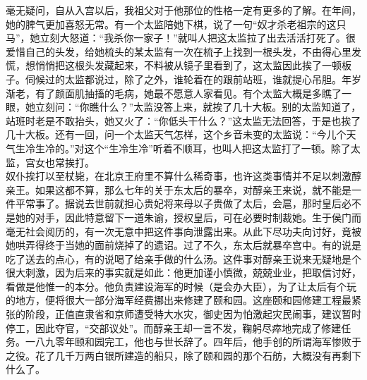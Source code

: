 毫无疑问，自从入宫以后，我祖父对于他那位的性格一定有更多的了解。在年间，她的脾气更加喜怒无常。有一个太监陪她下棋，说了一句“奴才杀老祖宗的这只马”，她立刻大怒道：“我杀你一家子！”就叫人把这太监拉了出去活活打死了。很爱惜自己的头发，给她梳头的某太监有一次在梳子上找到一根头发，不由得心里发慌，想悄悄把这根头发藏起来，不料被从镜子里看到了，这太监因此挨了一顿板子。伺候过的太监都说过，除了之外，谁轮着在的跟前站班，谁就提心吊胆。年岁渐老，有了颜面肌抽搐的毛病，她最不愿意人家看见。有个太监大概是多瞧了一眼，她立刻问：“你瞧什么？”太监没答上来，就挨了几十大板。别的太监知道了，站班时老是不敢抬头，她又火了：“你低头干什么？”这太监无法回答，于是也挨了几十大板。还有一回，问一个太监天气怎样，这个乡音未变的太监说：“今儿个天气生冷生冷的。”对这个“生冷生冷”听着不顺耳，也叫人把这太监打了一顿。除了太监，宫女也常挨打。\\

奴仆挨打以至杖毙，在北京王府里不算什么稀奇事，也许这类事情并不足以刺激醇亲王。如果这都不算，那么七年的关于东太后的暴卒，对醇亲王来说，就不能是一件平常事了。据说去世前就担心贵妃将来母以子贵做了太后，会扈，那时皇后必不是她的对手，因此特意留下一道朱谕，授权皇后，可在必要时制裁她。生于侯门而毫无社会阅历的，有一次无意中把这件事向泄露出来。从此下尽功夫向讨好，竟被她哄弄得终于当她的面前烧掉了的遗诏。过了不久，东太后就暴卒宫中。有的说是吃了送去的点心，有的说喝了给亲手做的什么汤。这件事对醇亲王说来无疑地是个很大刺激，因为后来的事实就是如此：他更加谨小慎微，兢兢业业，把取信讨好，看做是他惟一的本分。他负责建设海军的时候（是会办大臣），为了让太后有个玩的地方，便将很大一部分海军经费挪出来修建了颐和园。这座颐和园修建工程最紧张的阶段，正值直隶省和京师遭受特大水灾，御史因为怕激起灾民闹事，建议暂时停工，因此夺官，“交部议处”。而醇亲王却一言不发，鞠躬尽瘁地完成了修建任务。一八九零年颐和园完工，他也与世长辞了。四年后，他手创的所谓海军惨败于之役。花了几千万两白银所建造的船只，除了颐和园的那个石舫，大概没有再剩下什么了。
